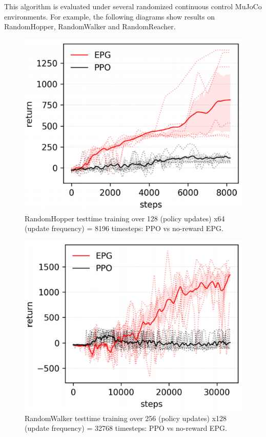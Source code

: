\par
This algorithm is evaluated under several randomized continuous control MuJoCo environments. For example, the following diagrams show results on RandomHopper, RandomWalker and RandomReacher.
\begin{figure}[H]
	\includegraphics[scale=0.6]{hopper.png}
	\centering
	\caption{RandomHopper testtime training over 128 (policy updates) x64 (update frequency) = 8196 timesteps: PPO vs no-reward EPG.}
	\label{hopper}
\end{figure}
\begin{figure}[H]
	\includegraphics[scale=0.6]{walker.png}
	\centering
	\caption{RandomWalker testtime training over 256 (policy updates) x128 (update frequency) = 32768 timesteps: PPO vs no-reward EPG.}
	\label{walker}
\end{figure}
